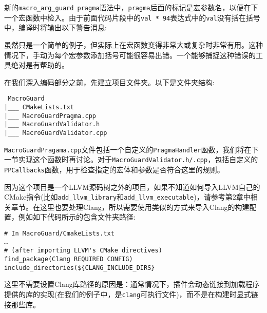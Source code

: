新的\texttt{macro\_arg\_guard pragma}语法中，\texttt{pragma}后面的标记是宏参数名，以便在下一个宏函数中检入。由于前面代码片段中的\texttt{val * 94}表达式中的\texttt{val}没有括在括号中，编译时将输出以下警告消息:


虽然只是一个简单的例子，但实际上在宏函数变得非常大或复杂时非常有用。这种情况下，手动为每个宏参数添加括号可能很容易出错。一个能够捕捉这种错误的工具绝对是有帮助的。

在我们深入编码部分之前，先建立项目文件夹。以下是文件夹结构:

\begin{tcolorbox}[colback=white,colframe=black]
\tt
{}
MacroGuard \\
\hspace*{0.5cm}|\_\_\_ CMakeLists.txt \\
\hspace*{0.5cm}|\_\_\_ MacroGuardPragma.cpp \\
\hspace*{0.5cm}|\_\_\_ MacroGuardValidator.h \\
\hspace*{0.5cm}|\_\_\_ MacroGuardValidator.cpp
\end{tcolorbox}

\texttt{MacroGuardPragama.cpp}文件包括一个自定义的\texttt{PragmaHandler}函数，我们将在下一节实现这个函数时再讨论。对于\texttt{MacroGuardValidator.h/.cpp}，包括自定义的\texttt{PPCallbacks}函数，用于检查指定的宏体和参数是否符合这里的规则。

因为这个项目是一个LLVM源码树之外的项目，如果不知道如何导入LLVM自己的CMake指令(比如\texttt{add\_llvm\_library}和\texttt{add\_llvm\_executable})，请参考第2章中相关章节。在这里也要处理Clang，所以需要使用类似的方式来导入Clang的构建配置，例如如下代码所示的包含文件夹路径:

\begin{lstlisting}[style=styleCMake]
# In MacroGuard/CmakeLists.txt
…
# (after importing LLVM's CMake directives)
find_package(Clang REQUIRED CONFIG)
include_directories(${CLANG_INCLUDE_DIRS}
\end{lstlisting}

这里不需要设置Clang库路径的原因是：通常情况下，插件会动态链接到加载程序提供的库的实现(在我们的例子中，是\texttt{clang}可执行文件)，而不是在构建时显式链接那些库。

